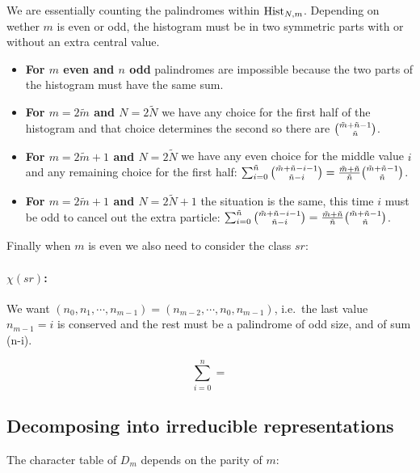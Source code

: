 We are essentially counting the palindromes within $\operatorname{Hist}_{N,m}$. Depending on wether $m$ is even or odd, the histogram must be in two symmetric parts with or without an extra central value.


\begin{itemize}
\item \textbf{For $m$ even and $n$ odd} palindromes are impossible because the two parts of the histogram must have the same sum.
\item \textbf{For $m = 2\tilde{m}$ and $N = 2\tilde{N}$} we have any choice for the first half of the histogram and that choice determines the second so there are ${{\tilde{m} + \tilde{n} - 1} \choose {\tilde{n}}}$.
\item \textbf{For $m = 2\tilde{m} + 1$ and $N = 2\tilde{N}$} we have any even choice for the middle value $i$ and any remaining choice for the first half: $\sum_{i=0}^{\tilde{n}} {{\tilde{m} + \tilde{n} - i - 1} \choose {\tilde{n} - i}} = \frac{\tilde{m} + \tilde{n}}{\tilde{n}} {{\tilde{m} + \tilde{n} - 1} \choose {\tilde{n}}}$.
\item \textbf{For $m = 2\tilde{m} + 1$ and $N = 2\tilde{N} + 1$} the situation is the same, this time $i$ must be odd to cancel out the extra particle: $\sum_{i=0}^{\tilde{n}} {{\tilde{m} + \tilde{n} - i - 1} \choose {\tilde{n} - i}} = \frac{\tilde{m} + \tilde{n}}{\tilde{n}} {{\tilde{m} + \tilde{n} - 1} \choose {\tilde{n}}}$.
\end{itemize}

Finally when $m$ is even we also need to consider the class $sr$:

\paragraph{$\chi(sr)$:} We want $(n_0,n_1,\cdots,n_{m-1}) = (n_{m-2},\cdots, n_{0}, n_{m-1})$, i.e.\ the last value $n_{m-1} = i$ is conserved and the rest must be a palindrome of odd size, and of sum (n-i).

\[\sum_{i=0}^{n} =\]

\subsection{Decomposing into irreducible representations}

The character table of $D_{m}$ depends on the parity of $m$:

